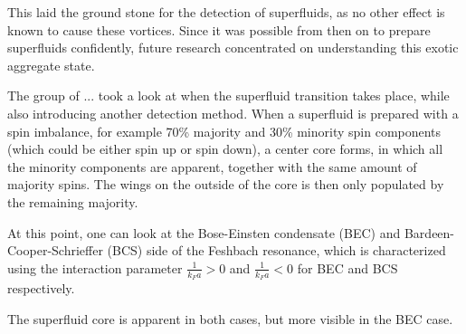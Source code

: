 This laid the ground stone for the detection of superfluids, as no other effect is known to cause these vortices.
Since it was possible from then on to prepare superfluids confidently, future research concentrated on understanding this exotic aggregate state.

The group of ...  took a look at when the superfluid transition takes place, while also introducing another detection method. When a superfluid is prepared with a spin imbalance, for example 70\% majority and 30\% minority spin components (which could be either spin up or spin down), a center core forms, in which all the minority components are apparent, together with the same amount of majority spins. The wings on the outside of the core is then only populated by the remaining majority.

At this point, one can look at the Bose-Einsten condensate (BEC) and Bardeen-Cooper-Schrieffer (BCS) side of the Feshbach resonance, which is characterized using the interaction parameter $\frac{1}{k_Fa} > 0$ and $\frac{1}{k_Fa} < 0$ for BEC and BCS respectively.

The superfluid core is apparent in both cases, but more visible in the BEC case.